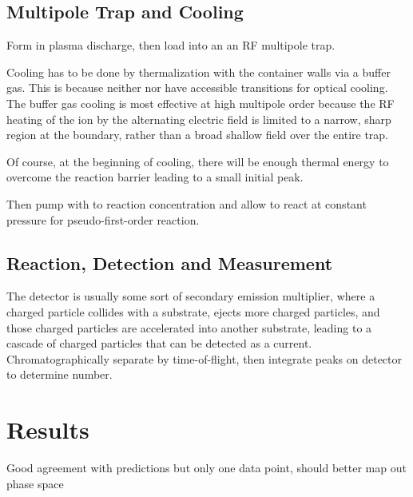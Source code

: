 \documentclass[12pt]{article}
\begin{document}
\subsection{Multipole Trap and Cooling}
Form  in plasma discharge, then load into an an RF multipole trap. 

Cooling has to be done by thermalization with the container walls via a buffer gas. This is because neither  nor  have accessible transitions for optical cooling. The buffer gas cooling is most effective at high multipole order because the RF heating of the ion by the alternating electric field is limited to a narrow, sharp region at the boundary, rather than a broad shallow field over the entire trap.


Of course, at the beginning of cooling, there will be enough thermal energy to overcome the reaction barrier leading to a small initial  peak.

Then pump with  to reaction concentration and allow to react at constant pressure for pseudo-first-order reaction.

\subsection{Reaction, Detection and Measurement}
The detector is usually some sort of secondary emission multiplier, where a charged particle collides with a substrate, ejects more charged particles, and those charged particles are accelerated into another substrate, leading to a cascade of charged particles that can be detected as a current.
Chromatographically separate by time-of-flight, then integrate peaks on detector to determine number.
\section{Results}
Good agreement with predictions but only one data point, should better map out phase space

\newpage{}

%

\newpage{}
\appendix{}
\end{document}
